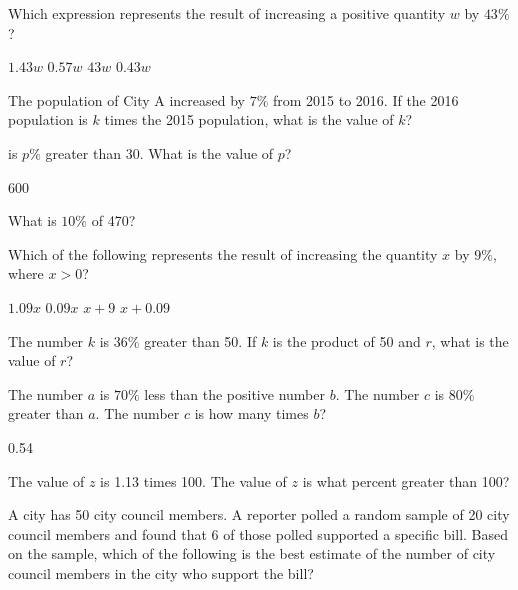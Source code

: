 \question[1]
Which expression represents the result of increasing a positive quantity $w$ by $43\%$?
\begin{choices}
  \CorrectChoice $1.43w$
  \choice $0.57w$
  \choice $43w$
  \choice $0.43w$
\end{choices}

\question[1]
The population of City A increased by $7\%$ from 2015 to 2016. If the 2016 population is $k$ times the 2015 population, what is the value of $k$?
\begin{choices}
\end{choices}

 is $p\%$ greater than 30. What is the value of $p$?
\begin{solution}
600
\end{solution}


\newpage

\question[1]
What is $10\%$ of 470?
\begin{choices}
\end{choices}

\question[1]
Which of the following represents the result of increasing the quantity $x$ by $9\%$, where $x>0$?
\begin{choices}
  \CorrectChoice $1.09x$
  \choice $0.09x$
  \choice $x+9$
  \choice $x+0.09$
\end{choices}

\question[1]
The number $k$ is $36\%$ greater than 50. If $k$ is the product of 50 and $r$, what is the value of $r$?
\begin{choices}
\end{choices}

\question[1]
The number $a$ is $70\%$ less than the positive number $b$. The number $c$ is $80\%$ greater than $a$. The number $c$ is how many times $b$?
\begin{solution}
0.54
\end{solution}


\newpage

\question[1]
The value of $z$ is 1.13 times 100. The value of $z$ is what percent greater than 100?
\begin{choices}
\end{choices}

\question[1]
A city has 50 city council members. A reporter polled a random sample of 20 city council members and found that 6 of those polled supported a specific bill. Based on the sample, which of the following is the best estimate of the number of city council members in the city who support the bill?
\begin{choices}
\end{choices}


